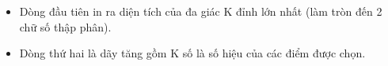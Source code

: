 \begin{itemize}
	\item     Dòng đầu tiên in ra diện tích của đa giác K đỉnh lớn nhất (làm tròn đến 2 chữ số thập phân).   
	\item     Dòng thứ hai là dãy tăng gồm K số là số hiệu của các điểm được chọn.   
\end{itemize}